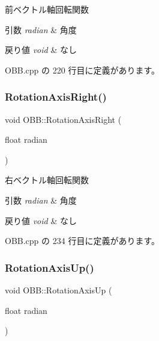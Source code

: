 前ベクトル軸回転関数 


\begin{DoxyParams}{引数}
{\em radian} & 角度 \\
\hline
\end{DoxyParams}

\begin{DoxyRetVals}{戻り値}
{\em void} & なし \\
\hline
\end{DoxyRetVals}


 O\+B\+B.\+cpp の 220 行目に定義があります。

\mbox{\label{class_o_b_b_a09c39baa440c9cb9f10af2abc92e9e71}} 
\subsubsection{\texorpdfstring{Rotation\+Axis\+Right()}{RotationAxisRight()}}
{\footnotesize\ttfamily void O\+B\+B\+::\+Rotation\+Axis\+Right (\begin{DoxyParamCaption}\item[{float}]{radian }\end{DoxyParamCaption})}



右ベクトル軸回転関数 


\begin{DoxyParams}{引数}
{\em radian} & 角度 \\
\hline
\end{DoxyParams}

\begin{DoxyRetVals}{戻り値}
{\em void} & なし \\
\hline
\end{DoxyRetVals}


 O\+B\+B.\+cpp の 234 行目に定義があります。

\mbox{\label{class_o_b_b_ab0919b09423e3761a5a804a12d71580d}} 
\subsubsection{\texorpdfstring{Rotation\+Axis\+Up()}{RotationAxisUp()}}
{\footnotesize\ttfamily void O\+B\+B\+::\+Rotation\+Axis\+Up (\begin{DoxyParamCaption}\item[{float}]{radian }\end{DoxyParamCaption})}



